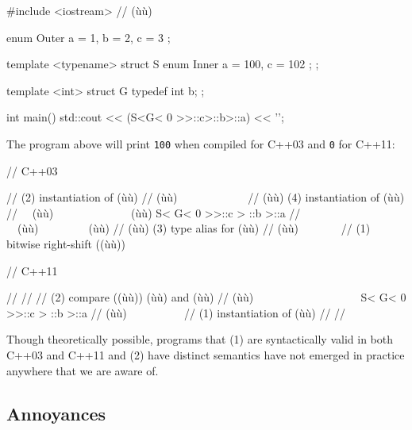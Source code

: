 \begin{emcppshiddenlisting}[emcppsbatch=e4]
#include <iostream>    // (ù{}ù)
\end{emcppshiddenlisting}
\begin{emcppslisting}[emcppsbatch=e4]
enum Outer { a = 1, b = 2, c = 3 };

template <typename> struct S
{
    enum Inner { a = 100, c = 102 };
};

template <int> struct G
{
    typedef int b;
};

int main()
{
    std::cout << (S<G< 0 >>::c>::b>::a) << '\n';
}
\end{emcppslisting}

\noindent The program above will print \lstinline!100! when compiled for C++03 and
\lstinline!0! for C++11:

\begin{emcppslisting}[emcppsignore={Pathological}]
// C++03

//     (2) instantiation of (ù{}ù)
//    (ù{\codeincomments{$\|$}}ù)~~~~~~~~~~~~
//    (ù{\codeincomments{$\|\:\,|\:\,\|$}}ù)   (4) instantiation of (ù{}ù)
//  ~~(ù{\codeincomments{$\|\downarrow\|$}}ù)~~~~~~~~~~~~~~(ù{\codeincomments{$\downarrow$}}ù)
    S< G< 0 >>::c > ::b >::a
//    ~~(ù{\codeincomments{$\|\,\,\uparrow\,\,\|$}}ù)~~~~~~~~~(ù{\codeincomments{$\uparrow$}}ù)
//      (ù{\codeincomments{$\|\:\,\,\,|\:\,\,\,\|$}}ù) (3) type alias for (ù{}ù)
//      (ù{\codeincomments{$\|$}}ù)~~~~~~~
// (1) bitwise right-shift ((ù{}ù))
\end{emcppslisting}


\begin{emcppslisting}[emcppsignore={Pathological}]
// C++11

//
//
//  (2) compare ((ù{\codeincomments{>}}ù)) (ù{}ù) and (ù{}ù)
//  (ù{\codeincomments{$\downarrow$}}ù) ~~~~~~~~~~~~~~~~~~
    S< G< 0 >>::c > ::b >::a
//  (ù{\codeincomments{$\uparrow$}}ù) ~~~~~~~~~
//  (1) instantiation of (ù{}ù)
//
//
\end{emcppslisting}

\noindent Though theoretically possible, programs that (1) are syntactically valid
in both C++03 and C++11 and (2) have distinct semantics have not
emerged in practice anywhere that we are aware of.

\subsection[Annoyances]{Annoyances}\label{annoyances}

